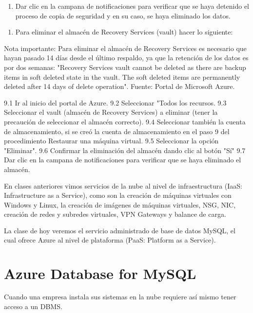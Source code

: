 \begin{enumerate}
\item Dar clic en la campana de notificaciones para verificar que se haya detenido el proceso de copia de seguridad y en su caso, se haya eliminado los datos.
\end{enumerate}

\begin{enumerate}
\item Para eliminar el almacén de Recovery Services (vault) hacer lo siguiente:
\end{enumerate}

Nota importante: Para eliminar el almacén de Recovery Services es necesario que hayan pasado 14 días desde el último respaldo, ya que la retención de los datos es por dos semanas: "Recovery Services vault cannot be deleted as there are backup items in soft deleted state in the vault. The soft deleted items are permanently deleted after 14 days of delete operation". Fuente: Portal de Microsoft Azure.

9.1 Ir al inicio del portal de Azure. 9.2 Seleccionar "Todos los recursos. 9.3 Seleccionar el vault (almacén de Recovery Services) a eliminar (tener la precaución de seleccionar el almacén correcto). 9.4 Seleccionar también la cuenta de almacenamiento, si se creó la cuenta de almacenamiento en el paso 9 del procedimiento Restaurar una máquina virtual. 9.5 Seleccionar la opción "Eliminar". 9.6 Confirmar la eliminación del almacén dando clic al botón "Sí" 9.7 Dar clic en la campana de notificaciones para verificar que se haya eliminado el almacén.

\clearpage


En clases anteriores vimos servicios de la nube al nivel de infraestructura (IaaS: Infrastructure as a Service), como son la creación de máquinas virtuales con Windows y Linux, la creación de imágenes de máquinas virtuales, NSG, NIC, creación de redes y subredes virtuales, VPN Gateways y balance de carga.

La clase de hoy veremos el servicio administrado de base de datos MySQL, el cual ofrece Azure al nivel de plataforma (PaaS: Platform as a Service).

\section{Azure Database for MySQL}

Cuando una empresa instala sus sistemas en la nube requiere así mismo tener acceso a un DBMS.

